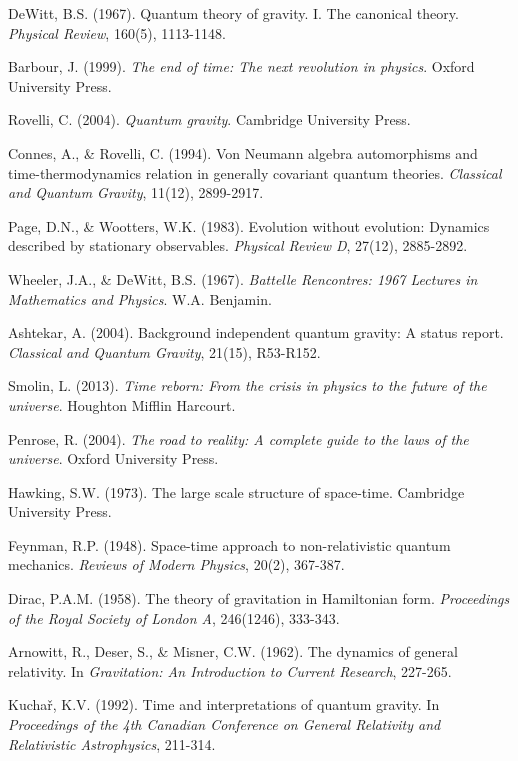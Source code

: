 \documentclass[12pt]{article}
\begin{document}
\begin{thebibliography}{99}

DeWitt, B.S. (1967). Quantum theory of gravity. I. The canonical theory. \emph{Physical Review}, 160(5), 1113-1148.

Barbour, J. (1999). \emph{The end of time: The next revolution in physics}. Oxford University Press.

Rovelli, C. (2004). \emph{Quantum gravity}. Cambridge University Press.

Connes, A., \& Rovelli, C. (1994). Von Neumann algebra automorphisms and time-thermodynamics relation in generally covariant quantum theories. \emph{Classical and Quantum Gravity}, 11(12), 2899-2917.

Page, D.N., \& Wootters, W.K. (1983). Evolution without evolution: Dynamics described by stationary observables. \emph{Physical Review D}, 27(12), 2885-2892.

Wheeler, J.A., \& DeWitt, B.S. (1967). \emph{Battelle Rencontres: 1967 Lectures in Mathematics and Physics}. W.A. Benjamin.

Ashtekar, A. (2004). Background independent quantum gravity: A status report. \emph{Classical and Quantum Gravity}, 21(15), R53-R152.

Smolin, L. (2013). \emph{Time reborn: From the crisis in physics to the future of the universe}. Houghton Mifflin Harcourt.

Penrose, R. (2004). \emph{The road to reality: A complete guide to the laws of the universe}. Oxford University Press.

Hawking, S.W. (1973). The large scale structure of space-time. Cambridge University Press.

Feynman, R.P. (1948). Space-time approach to non-relativistic quantum mechanics. \emph{Reviews of Modern Physics}, 20(2), 367-387.

Dirac, P.A.M. (1958). The theory of gravitation in Hamiltonian form. \emph{Proceedings of the Royal Society of London A}, 246(1246), 333-343.

Arnowitt, R., Deser, S., \& Misner, C.W. (1962). The dynamics of general relativity. In \emph{Gravitation: An Introduction to Current Research}, 227-265.

Kuchař, K.V. (1992). Time and interpretations of quantum gravity. In \emph{Proceedings of the 4th Canadian Conference on General Relativity and Relativistic Astrophysics}, 211-314.


\end{thebibliography}
\end{document}
